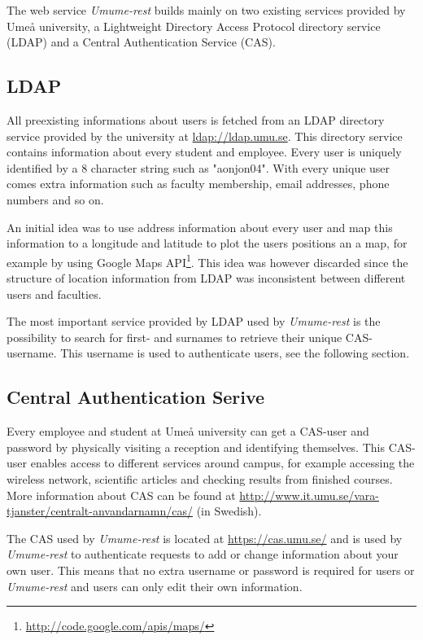 \documentclass[titlepage, twocolumn, a4paper, 10pt]{article}
\begin{document}
The web service \textit{Umume-rest} builds mainly on two existing services provided by Umeå university, a Lightweight Directory Access Protocol directory service (LDAP) and a Central Authentication Service (CAS).

\subsection{LDAP}\label{sec:ldap}
All preexisting informations about users is fetched from an LDAP directory service provided by the university at \url{ldap://ldap.umu.se}. This directory service contains information about every student and employee. Every user is uniquely identified by a 8 character string such as "aonjon04". With every unique user comes extra information such as faculty membership, email addresses, phone numbers and so on.

An initial idea was to use address information about every user and map this information to a longitude and latitude to plot the users positions an a map, for example by using Google Maps API\footnote{\url{http://code.google.com/apis/maps/}}. This idea was however discarded since the structure of location information from LDAP was inconsistent between different users and faculties.

The most important service provided by LDAP used by \textit{Umume-rest} is the possibility to search for first- and surnames to retrieve their unique CAS-username. This username is used to authenticate users, see the following section.

\subsection{Central Authentication Serive}\label{sec:cas}
Every employee and student at Umeå university can get a CAS-user and password by physically visiting a reception and identifying themselves. This CAS-user enables access to different services around campus, for example accessing the wireless network, scientific articles and checking results from finished courses. More information about CAS can be found at \url{http://www.it.umu.se/vara-tjanster/centralt-anvandarnamn/cas/} (in Swedish).

The CAS used by \textit{Umume-rest} is located at \url{https://cas.umu.se/} and is used by \textit{Umume-rest} to authenticate requests to add or change information about your own user. This means that no extra username or password is required for users or \textit{Umume-rest} and users can only edit their own information.
\end{document}
